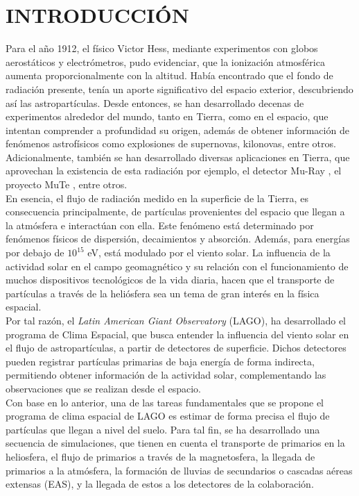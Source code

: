 \newpage
\chapter*{INTRODUCCIÓN}
\label{sec:intro}

Para el año 1912, el físico Victor Hess, mediante experimentos con globos aerostáticos y electrómetros, pudo evidenciar, que la ionización atmosférica aumenta proporcionalmente con la altitud. Había encontrado que el fondo de radiación presente, tenía un aporte significativo del espacio exterior, descubriendo así las astropartículas. Desde entonces, se han desarrollado decenas de experimentos alrededor del mundo, tanto en Tierra, como en el espacio, que intentan comprender a profundidad su origen, además de obtener información de fenómenos astrofísicos como explosiones de supernovas, kilonovas, entre otros. Adicionalmente, también se han desarrollado diversas aplicaciones en Tierra, que aprovechan la existencia de esta radiación por ejemplo, el detector Mu-Ray \cite{Mu-Ray}, el proyecto MuTe \cite{MuTe}, entre otros.\\

En esencia, el flujo de radiación medido en la superficie de la Tierra, es consecuencia principalmente, de partículas provenientes del espacio que llegan a la atmósfera e interactúan con ella. Este fenómeno está determinado por fenómenos físicos de dispersión, decaimientos y absorción. Además, para energías por debajo de $10^{15}$ eV, está modulado por el viento solar. La influencia de la actividad solar en el campo geomagnético y su relación con el funcionamiento de muchos dispositivos tecnológicos de la vida diaria, hacen que el transporte de partículas a través de la heliósfera sea un tema de gran interés en la física espacial. \\

Por tal razón, el \textit{Latin American Giant Observatory} (LAGO), ha desarrollado el programa de Clima Espacial, que busca entender la influencia del viento solar en el flujo de astropartículas, a partir de detectores de superficie. Dichos detectores pueden registrar partículas primarias de baja energía de forma indirecta, permitiendo obtener información de la actividad solar, complementando las observaciones que se realizan desde el espacio.\\

Con base en lo anterior, una de las tareas fundamentales  que se propone el programa de clima espacial de LAGO es estimar de forma precisa el flujo de partículas que llegan a nivel del suelo. Para tal fin, se ha desarrollado una secuencia de simulaciones, que tienen en cuenta el transporte de primarios en la heliosfera, el flujo de primarios a través de la magnetosfera, la llegada de primarios a la atmósfera, la formación de lluvias de secundarios o cascadas aéreas extensas (EAS), y la llegada de estos a los detectores de la colaboración.\\
%

